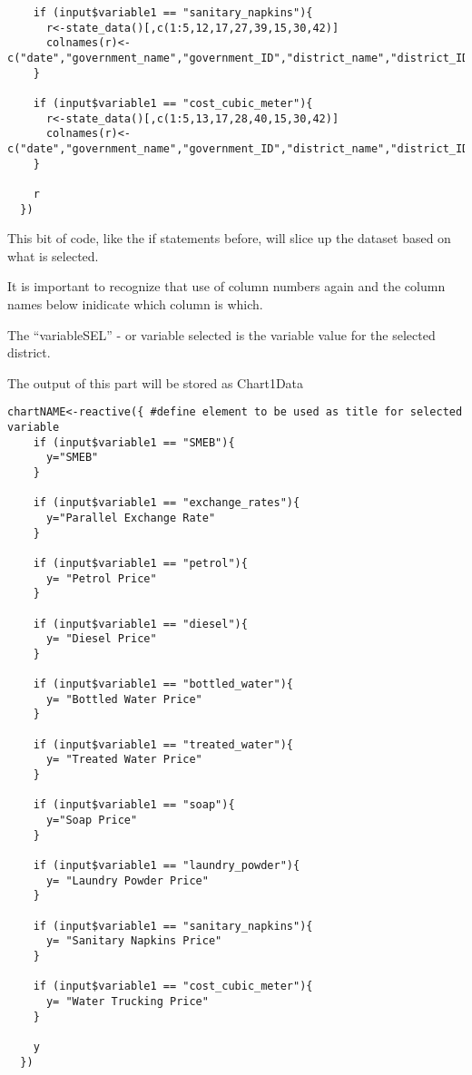 \documentclass[
]{article}
\begin{document}
\begin{verbatim}
    if (input$variable1 == "sanitary_napkins"){
      r<-state_data()[,c(1:5,12,17,27,39,15,30,42)]
      colnames(r)<-c("date","government_name","government_ID","district_name","district_ID","variableSEL","date2","governorate_val","nat_val","dist_obs","gov_obs","nat_obs")
    }
    
    if (input$variable1 == "cost_cubic_meter"){
      r<-state_data()[,c(1:5,13,17,28,40,15,30,42)]
      colnames(r)<-c("date","government_name","government_ID","district_name","district_ID","variableSEL","date2","governorate_val","nat_val","dist_obs","gov_obs","nat_obs")
    }
    
    r
  })
\end{verbatim}

This bit of code, like the if statements before, will slice up the
dataset based on what is selected.

It is important to recognize that use of column numbers again and the
column names below inidicate which column is which.

The ``variableSEL'' - or variable selected is the variable value for the
selected district.

The output of this part will be stored as Chart1Data

\begin{verbatim}
chartNAME<-reactive({ #define element to be used as title for selected variable
    if (input$variable1 == "SMEB"){
      y="SMEB"
    }
    
    if (input$variable1 == "exchange_rates"){
      y="Parallel Exchange Rate"
    }
    
    if (input$variable1 == "petrol"){
      y= "Petrol Price"
    }
    
    if (input$variable1 == "diesel"){
      y= "Diesel Price"
    }
    
    if (input$variable1 == "bottled_water"){
      y= "Bottled Water Price"
    }
    
    if (input$variable1 == "treated_water"){
      y= "Treated Water Price"
    }
    
    if (input$variable1 == "soap"){
      y="Soap Price"
    }
    
    if (input$variable1 == "laundry_powder"){
      y= "Laundry Powder Price"
    }
    
    if (input$variable1 == "sanitary_napkins"){
      y= "Sanitary Napkins Price"
    }
    
    if (input$variable1 == "cost_cubic_meter"){
      y= "Water Trucking Price"
    }
    
    y
  })
\end{verbatim}
\end{document}
